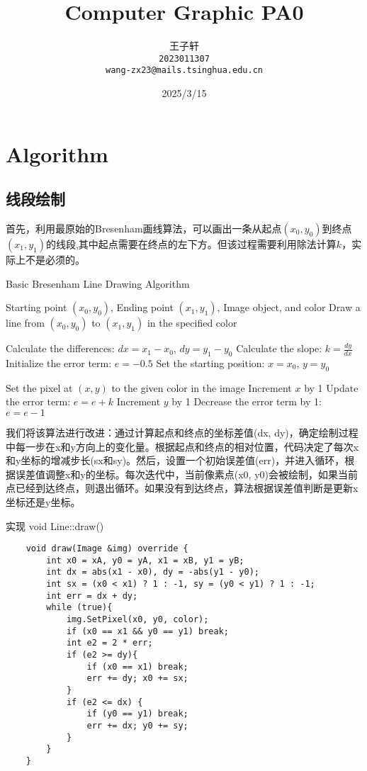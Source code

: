\documentclass[a4paper,twoside]{article}
\title{Computer Graphic PA0}
\author{
  王子轩\\
  \texttt{2023011307} \\
  \texttt{wang-zx23@mails.tsinghua.edu.cn} \\
}
\date{2025/3/15}
\begin{document}
\maketitle
\section{Algorithm}
\subsection{线段绘制}
首先，利用最原始的Bresenham画线算法，可以画出一条从起点$(x_0,y_0)$到终点$(x_1, y_1)$的线段,其中起点需要在终点的左下方。但该过程需要利用除法计算$k$，实际上不是必须的。
\begin{algorithm}[H]
    \caption{Basic Bresenham Line Drawing Algorithm}
    \label{alg:bresenham}
    \begin{algorithmic}[1]
        \REQUIRE Starting point $(x_0, y_0)$, Ending point $(x_1, y_1)$, Image object, and color
        \ENSURE Draw a line from $(x_0, y_0)$ to $(x_1, y_1)$ in the specified color

        \STATE Calculate the differences: $dx = x_1 - x_0$, $dy = y_1 - y_0$
        \STATE Calculate the slope: $k = \frac{dy}{dx}$
        \STATE Initialize the error term: $e = -0.5$
        \STATE Set the starting position: $x = x_0$, $y = y_0$

            \STATE Set the pixel at $(x, y)$ to the given color in the image
            \STATE Increment $x$ by 1
            \STATE Update the error term: $e = e + k$
                \STATE Increment $y$ by 1
                \STATE Decrease the error term by 1: $e = e - 1$
            \ENDIF
        \ENDFOR
    \end{algorithmic}
\end{algorithm}
我们将该算法进行改进：通过计算起点和终点的坐标差值(dx, dy)，确定绘制过程中每一步在x和y方向上的变化量。根据起点和终点的相对位置，代码决定了每次x和y坐标的增减步长(sx和sy)。然后，设置一个初始误差值(err)，并进入循环，根据误差值调整x和y的坐标。每次迭代中，当前像素点(x0, y0)会被绘制，如果当前点已经到达终点，则退出循环。如果没有到达终点，算法根据误差值判断是更新x坐标还是y坐标。
\begin{listing}[H]
	\caption{实现 void Line::draw()}
	\label{code:processdweet}
	\begin{verbatim}
    void draw(Image &img) override {
        int x0 = xA, y0 = yA, x1 = xB, y1 = yB;
        int dx = abs(x1 - x0), dy = -abs(y1 - y0);
        int sx = (x0 < x1) ? 1 : -1, sy = (y0 < y1) ? 1 : -1;
        int err = dx + dy;
        while (true){
            img.SetPixel(x0, y0, color);
            if (x0 == x1 && y0 == y1) break;
            int e2 = 2 * err;
            if (e2 >= dy){ 
                if (x0 == x1) break;
                err += dy; x0 += sx; 
            }
            if (e2 <= dx) {
                if (y0 == y1) break;
                err += dx; y0 += sy;  
            }
        }
    }
\end{verbatim}
\end{listing}
\end{document}
